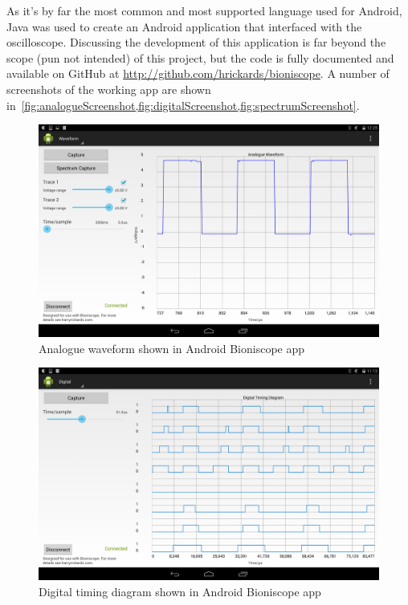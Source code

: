 As it's by far the most common and most supported language used for Android,
Java was used to create an Android application that interfaced with the
oscilloscope. Discussing the development of this application is far beyond the
scope (pun not intended) of this project, but the code is fully documented and
available on GitHub at \url{http://github.com/hrickards/bioniscope}. A number of
screenshots of the working app are shown
in~\cref{fig:analogueScreenshot,fig:digitalScreenshot,fig:spectrumScreenshot}.

\begin{landscape}
  \begin{figure}[h]
    \includegraphics[width=\linewidth]{img/screenshots/analogue.png}
    \caption{Analogue waveform shown in Android Bioniscope app}
    \label{fig:analogueScreenshot}
  \end{figure}
\end{landscape}

\begin{landscape}
  \begin{figure}[h]
    \includegraphics[width=\linewidth]{img/screenshots/digital.png}
    \caption{Digital timing diagram shown in Android Bioniscope app}
    \label{fig:digitalScreenshot}
  \end{figure}
\end{landscape}

